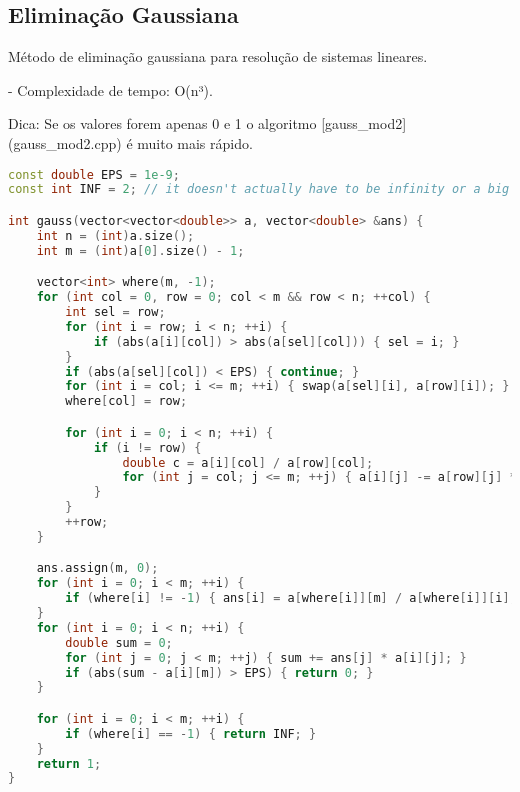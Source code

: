 \documentclass[11pt, a4paper, twoside]{article}
\begin{document}
\subsection{Eliminação Gaussiana}



Método de eliminação gaussiana para resolução de sistemas lineares.

- Complexidade de tempo: O(n³).


Dica: Se os valores forem apenas 0 e 1 o algoritmo [gauss\_mod2](gauss\_mod2.cpp) é muito mais rápido. 

\begin{lstlisting}[language=C++]
const double EPS = 1e-9;
const int INF = 2; // it doesn't actually have to be infinity or a big number

int gauss(vector<vector<double>> a, vector<double> &ans) {
    int n = (int)a.size();
    int m = (int)a[0].size() - 1;

    vector<int> where(m, -1);
    for (int col = 0, row = 0; col < m && row < n; ++col) {
        int sel = row;
        for (int i = row; i < n; ++i) {
            if (abs(a[i][col]) > abs(a[sel][col])) { sel = i; }
        }
        if (abs(a[sel][col]) < EPS) { continue; }
        for (int i = col; i <= m; ++i) { swap(a[sel][i], a[row][i]); }
        where[col] = row;

        for (int i = 0; i < n; ++i) {
            if (i != row) {
                double c = a[i][col] / a[row][col];
                for (int j = col; j <= m; ++j) { a[i][j] -= a[row][j] * c; }
            }
        }
        ++row;
    }

    ans.assign(m, 0);
    for (int i = 0; i < m; ++i) {
        if (where[i] != -1) { ans[i] = a[where[i]][m] / a[where[i]][i]; }
    }
    for (int i = 0; i < n; ++i) {
        double sum = 0;
        for (int j = 0; j < m; ++j) { sum += ans[j] * a[i][j]; }
        if (abs(sum - a[i][m]) > EPS) { return 0; }
    }

    for (int i = 0; i < m; ++i) {
        if (where[i] == -1) { return INF; }
    }
    return 1;
}
\end{lstlisting}
\end{document}
